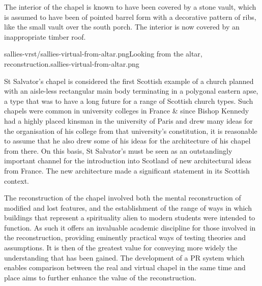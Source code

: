 The interior of the chapel is known to have been covered by a stone vault, which is assumed to have been of pointed barrel form with a decorative pattern of ribs, like the small vault over the south porch. The interior is now covered by an inappropriate timber roof.

       {sallies-vrst/sallies-virtual-from-altar.png}{Looking from the altar, reconstruction.}{sallies-virtual-from-altar.png}

St Salvator’s chapel is considered the first Scottish example of a church planned with an aisle-less rectangular main body terminating in a polygonal eastern apse, a type that was to have a long future for a range of Scottish church types. Such chapels were common in university colleges in France \& since Bishop Kennedy had a highly placed kinsman in the university of Paris and drew many ideas for the organisation of his college from that university’s constitution, it is reasonable to assume that he also drew some of his ideas for the architecture of his chapel from there. On this basis, St Salvator’s must be seen as an outstandingly important channel for the introduction into Scotland of new architectural ideas from France. The new architecture made a significant statement in its Scottish context. 

The reconstruction of the chapel involved both the mental reconstruction of modified and lost features, and the establishment of the range of ways in which buildings that represent a spirituality alien to modern students were intended to function. As such it offers an invaluable academic discipline for those involved in the reconstruction, providing eminently practical ways of testing theories and assumptions. It is then of the greatest value for conveying more widely the understanding that has been gained. The development of a PR system which enables comparison between the real and virtual chapel in the same time and place aims to further enhance the value of the reconstruction.


